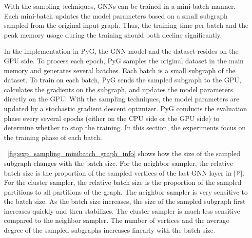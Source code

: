 With the sampling techniques, GNNs can be trained in a mini-batch manner.
Each mini-batch updates the model parameters based on a small subgraph sampled from the original input graph.
Thus, the training time per batch and the peak memory usage during the training should both decline significantly.

In the implementation in PyG, the GNN model and the dataset resides on the GPU side.
To process each epoch, PyG samples the original dataset in the main memory and generates several batches.
Each batch is a small subgraph of the dataset.
To train on each batch, PyG sends the sampled subgraph to the GPU, calculates the gradients on the subgraph, and updates the model parameters directly on the GPU.
With the sampling techniques, the model parameters are updated by a stochastic gradient descent optimizer.
PyG conducts the evaluation phase every several epochs (either on the CPU side or the GPU side) to determine whether to stop the training.
In this section, the experiments focus on the training phase of each batch.

\figurename~\ref{fig:exp_sampling_minibatch_graph_info} shows how the size of the sampled subgraph changes with the batch size.
For the neighbor sampler, the relative batch size is the proportion of the sampled vertices of the last GNN layer in $|\mathcal{V}|$.
For the cluster sampler, the relative batch size is the proportion of the sampled partitions to all partitions of the graph.
The neighbor sampler is very sensitive to the batch size.
As the batch size increases, the size of the sampled subgraph first increases quickly and then stabilizes.
The cluster sampler is much less sensitive compared to the neighbor sampler.
The number of vertices and the average degree of the sampled subgraphs increases linearly with the batch size.

